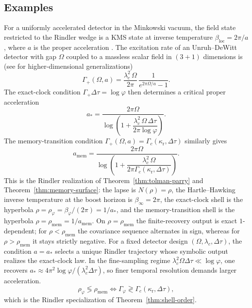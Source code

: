 \subsection{Examples}

\begin{example}\label{ex:rindler}
For a uniformly accelerated detector in the Minkowski vacuum, the field state restricted to the Rindler wedge is a KMS state at inverse temperature $\beta_{\mathrm{loc}}=2\pi/a$, where $a$ is the proper acceleration \cite{Unruh1976,BirDav1982,CrispinoHiguchiMatsas2008}. The excitation rate of an Unruh--DeWitt detector with gap $\Omega$ coupled to a massless scalar field in $(3\!+\!1)$ dimensions is \cite{Takagi1986,LoukoSatz2006,LoukoSatz2008} (see \cite{HodgkinsonLouko2012} for higher-dimensional generalizations)
\begin{equation}\label{eq:rindler-excitation}
\Gamma_+(\Omega,a)
=
\frac{\lambda_c^2\,\Omega}{2\pi}\,
\frac{1}{e^{2\pi\Omega/a}-1}.
\end{equation}
The exact-clock condition $\Gamma_+\Delta\tau=\log\varphi$ then determines a critical proper acceleration
\begin{equation}\label{eq:rindler-parry-acceleration}
a_*
=
\frac{2\pi\Omega}
     {\log\!\left(1+\dfrac{\lambda_c^2\,\Omega\,\Delta\tau}{2\pi\log\varphi}\right)}.
\end{equation}
The memory-transition condition $\Gamma_+(\Omega,a)=\Gamma_c(\kappa_{\mathrm r},\Delta\tau)$ similarly gives
\begin{equation}\label{eq:rindler-memory-acceleration}
a_{\mathrm{mem}}
=
\frac{2\pi\Omega}
     {\log\!\left(1+\dfrac{\lambda_c^2\,\Omega}{2\pi\Gamma_c(\kappa_{\mathrm r},\Delta\tau)}\right)}.
\end{equation}
This is the Rindler realization of Theorem~\ref{thm:tolman-parry} and Theorem~\ref{thm:memory-surface}: the lapse is $N(\rho)=\rho$, the Hartle--Hawking inverse temperature at the boost horizon is $\beta_\infty=2\pi$, the exact-clock shell is the hyperbola $\rho=\rho_\varphi=\beta_\varphi/(2\pi)=1/a_*$, and the memory-transition shell is the hyperbola $\rho=\rho_{\mathrm{mem}}=1/a_{\mathrm{mem}}$. On $\rho=\rho_{\mathrm{mem}}$ the finite-recovery output is exact $1$-dependent; for $\rho<\rho_{\mathrm{mem}}$ the covariance sequence alternates in sign, whereas for $\rho>\rho_{\mathrm{mem}}$ it stays strictly negative.
For a fixed detector design $(\Omega,\lambda_c,\Delta\tau)$, the condition $a=a_*$ selects a unique Rindler trajectory whose symbolic output realizes the exact-clock law. In the fine-sampling regime $\lambda_c^2\Omega\Delta\tau\ll\log\varphi$, one recovers $a_*\approx 4\pi^2\log\varphi/(\lambda_c^2\Delta\tau)$, so finer temporal resolution demands larger acceleration.
\[
\rho_\varphi \lessgtr \rho_{\mathrm{mem}}
\iff
\Gamma_\varphi \gtrless \Gamma_c(\kappa_{\mathrm r},\Delta\tau),
\]
which is the Rindler specialization of Theorem~\ref{thm:shell-order}.
\end{example}

